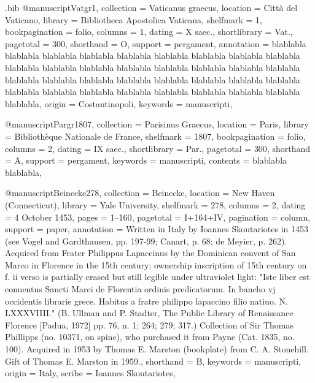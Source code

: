 
\begin{filecontents}{\jobname.bib}
@manuscript{Vatgr1,
  collection     = {Vaticanus graecus},
  location       = {Città del Vaticano},
  library        = {Bibliotheca Apostolica Vaticana},
  shelfmark      = {1},
  bookpagination = {folio},
  columns        = {1},
  dating         = {X saec.},
  shortlibrary   = {Vat.},
  pagetotal      = {300},
  shorthand      = {O},
  support        = {pergament},
  annotation     = {blablabla blablabla blablabla blablabla blablabla blablabla blablabla blablabla blablabla blablabla blablabla blablabla blablabla blablabla blablabla blablabla blablabla blablabla blablabla blablabla blablabla blablabla blablabla blablabla blablabla blablabla blablabla blablabla blablabla blablabla blablabla blablabla blablabla blablabla},
  origin         = {Costantinopoli},
  keywords       = {manuscripti},
}

@manuscript{Pargr1807,
  collection     = {Parisinus Graecus},
  location       = {Paris},
  library        = {Bibliothèque Nationale de France},
  shelfmark      = {1807},
  bookpagination = {folio},
  columns        = {2},
  dating         = {IX saec.},
  shortlibrary   = {Par.},
  pagetotal      = {300},
  shorthand      = {A},
  support        = {pergament},
  keywords       = {manuscripti},
  contents       = {blablabla blablabla},
}

@manuscript{Beinecke278,
  collection = {Beinecke},
  location   = {New Haven (Connecticut)},
  library    = {Yale University},
  shelfmark  = {278},
  columns    = {2},
  dating     = {4 October 1453},
  pages      = {1\recto--160\recto},
  pagetotal  = {I+164+IV},
  pagination = {column},
  support    = {paper},
  annotation = {Written in Italy by Ioannes Skoutariotes in 1453 (see Vogel and Gardthausen, pp. 197-99; Canart, p. 68; de Meyier, p. 262). Acquired from Frater Philippus Lapaccinus by the Dominican convent of San Marco in Florence in the 15th century; ownership inscription of 15th century on f. ii verso is partially erased but still legible under ultraviolet light: "Iste liber est conuentus Sancti Marci de Florentia ordinis predicatorum. In bancho vj occidentis librarie grece. Habitus a fratre philippo lapaccino filio natiuo. N. LXXXVIIII." (B. Ullman and P. Stadter, The Public Library of Renaissance Florence [Padua, 1972] pp. 76, n. 1; 264; 279; 317.) Collection of Sir Thomas Phillipps (no. 10371, on spine), who purchased it from Payne (Cat. 1835, no. 100). Acquired in 1953 by Thomas E. Marston (bookplate) from C. A. Stonehill. Gift of Thomas E. Marston in 1959.},
  shorthand      = {B},
  keywords   = {manuscripti},
  origin     = {Italy},
  scribe     = {Ioannes Skoutariotes},
}
\end{filecontents}

